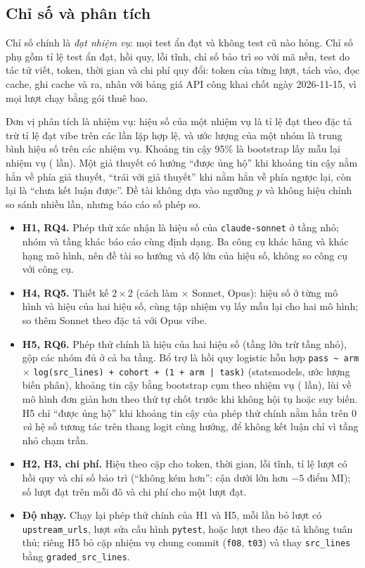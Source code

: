 \subsection{Chỉ số và phân tích}\label{sec:analysis}

Chỉ số chính là \emph{đạt nhiệm vụ}: mọi test ẩn đạt và không test cũ nào hỏng. Chỉ số phụ gồm tỉ lệ test
ẩn đạt, hồi quy, lỗi tĩnh, chỉ số bảo trì so với mã nền, test do tác tử viết, token, thời gian và chi phí
quy đổi: token của từng lượt, tách vào, đọc cache, ghi cache và ra, nhân với bảng giá API công khai chốt
ngày \mbox{2026-11-15}, vì mọi lượt chạy bằng gói thuê bao.

Đơn vị phân tích là nhiệm vụ: hiệu số của một nhiệm vụ là tỉ lệ đạt theo đặc tả trừ tỉ lệ đạt vibe trên
các lần lặp hợp lệ, và ước lượng của một nhóm là trung bình hiệu số trên các nhiệm vụ. Khoảng tin cậy 95\%
là bootstrap lấy mẫu lại nhiệm vụ (\NumResBootstrapB{} lần). Một giả thuyết có hướng ``được ủng hộ'' khi khoảng tin cậy
nằm hẳn về phía giả thuyết, ``trái với giả thuyết'' khi nằm hẳn về phía ngược lại, còn lại là ``chưa kết
luận được''. Đề tài không dựa vào ngưỡng $p$ và không hiệu chỉnh so sánh nhiều lần, nhưng báo cáo số phép so.

\begin{itemize}
\item \textbf{H1, RQ4.} Phép thử xác nhận là hiệu số của \texttt{claude-sonnet} ở tầng nhỏ; nhóm và tầng khác
báo cáo cùng định dạng. Ba công cụ khác hãng và khác hạng mô hình, nên đề tài so hướng và độ lớn của hiệu
số, không so công cụ với công cụ.
\item \textbf{H4, RQ5.} Thiết kế $2\times 2$ (cách làm $\times$ Sonnet, Opus): hiệu số ở từng mô hình và hiệu
của hai hiệu số, cùng tập nhiệm vụ lấy mẫu lại cho hai mô hình; so thêm Sonnet theo đặc tả với Opus vibe.
\item \textbf{H5, RQ6.} Phép thử chính là hiệu của hai hiệu số (tầng lớn trừ tầng nhỏ), gộp các nhóm đủ ở cả
ba tầng. Bổ trợ là hồi quy logistic hỗn hợp \texttt{pass \textasciitilde{} arm} $\times$
\texttt{log(src\_lines) + cohort + (1 + arm | task)} (statsmodels, ước lượng biến phân), khoảng tin cậy
bằng bootstrap cụm theo nhiệm vụ (\NumResModelBootstrapB{} lần), lùi về mô hình đơn giản hơn theo thứ tự chốt trước khi không hội
tụ hoặc suy biến. H5 chỉ ``được ủng hộ'' khi khoảng tin cậy của phép thử chính nằm hẳn trên 0 \emph{và} hệ
số tương tác trên thang logit cùng hướng, để không kết luận chỉ vì tầng nhỏ chạm trần.
\item \textbf{H2, H3, chi phí.} Hiệu theo cặp cho token, thời gian, lỗi tĩnh, tỉ lệ lượt có hồi quy và chỉ
số bảo trì (``không kém hơn'': cận dưới lớn hơn $-5$ điểm MI); số lượt đạt trên mỗi đô và chi phí cho một
lượt đạt.
\item \textbf{Độ nhạy.} Chạy lại phép thử chính của H1 và H5, mỗi lần bỏ lượt có \texttt{upstream\_urls},
lượt sửa cấu hình \texttt{pytest}, hoặc lượt theo đặc tả không tuân thủ; riêng H5 bỏ cặp nhiệm vụ chung
commit (\texttt{f08}, \texttt{t03}) và thay \texttt{src\_lines} bằng \texttt{graded\_src\_lines}.
\end{itemize}

